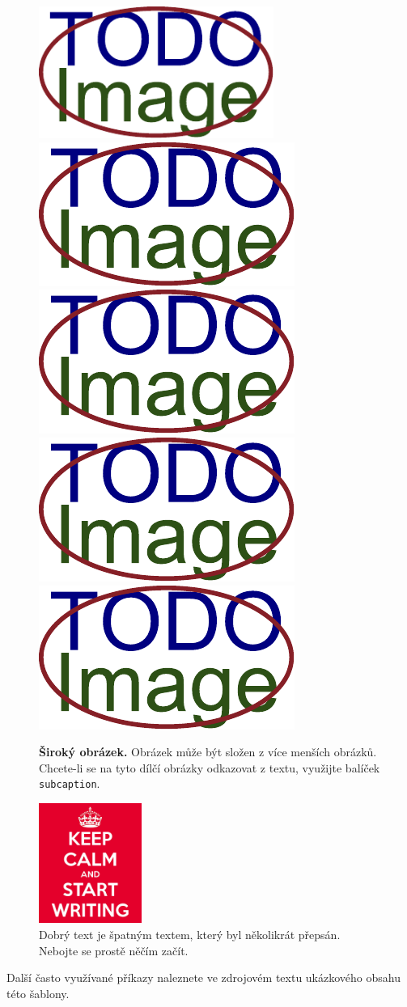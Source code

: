 \begin{figure}[h]\centering
  \centering
  \includegraphics[width=\linewidth,height=1.7in]{obrazky-figures/placeholder.pdf}\\[1pt]
  \includegraphics[width=0.24\linewidth]{obrazky-figures/placeholder.pdf}\hfill
  \includegraphics[width=0.24\linewidth]{obrazky-figures/placeholder.pdf}\hfill
  \includegraphics[width=0.24\linewidth]{obrazky-figures/placeholder.pdf}\hfill
  \includegraphics[width=0.24\linewidth]{obrazky-figures/placeholder.pdf}
  \caption{\textbf{Široký obrázek.} Obrázek může být složen z více menších obrázků. Chcete-li se na tyto dílčí obrázky odkazovat z textu, využijte balíček \texttt{subcaption}.}
  \label{sirokyObrazek}
\end{figure}

\begin{figure}[hbt]
	\centering
	\includegraphics[width=0.3\textwidth]{obrazky-figures/keep-calm.png}
	\caption{Dobrý text je špatným textem, který byl několikrát přepsán. Nebojte se prostě něčím začít.}
	\label{keepCalm}
\end{figure}

Další často využívané příkazy naleznete ve zdrojovém textu ukázkového obsahu této šablony.
